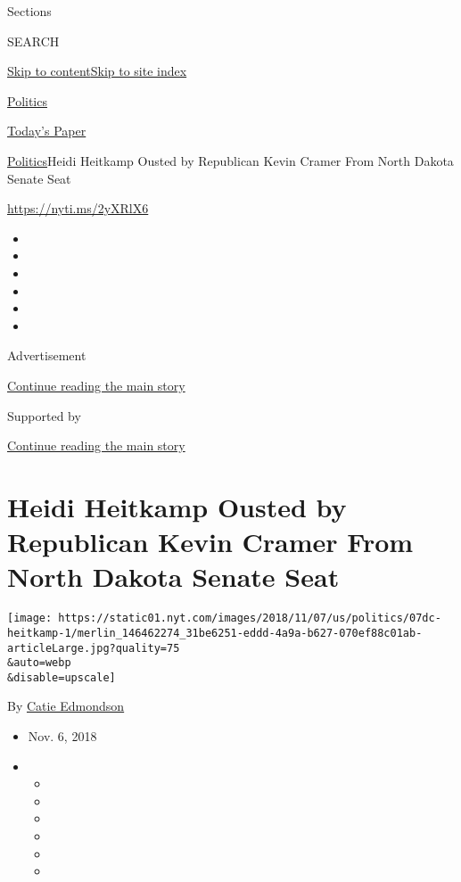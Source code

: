 Sections

SEARCH

\protect\hyperlink{site-content}{Skip to
content}\protect\hyperlink{site-index}{Skip to site index}

\href{https://www.nytimes.com/section/politics}{Politics}

\href{https://myaccount.nytimes.com/auth/login?response_type=cookie\&client_id=vi}{}

\href{https://www.nytimes.com/section/todayspaper}{Today's Paper}

\href{/section/politics}{Politics}\textbar{}Heidi Heitkamp Ousted by
Republican Kevin Cramer From North Dakota Senate Seat

\url{https://nyti.ms/2yXRlX6}

\begin{itemize}
\item
\item
\item
\item
\item
\item
\end{itemize}

Advertisement

\protect\hyperlink{after-top}{Continue reading the main story}

Supported by

\protect\hyperlink{after-sponsor}{Continue reading the main story}

\hypertarget{heidi-heitkamp-ousted-by-republican-kevin-cramer-from-north-dakota-senate-seat}{%
\section{Heidi Heitkamp Ousted by Republican Kevin Cramer From North
Dakota Senate
Seat}\label{heidi-heitkamp-ousted-by-republican-kevin-cramer-from-north-dakota-senate-seat}}

\texttt{[image: https://static01.nyt.com/images/2018/11/07/us/politics/07dc-heitkamp-1/merlin\_146462274\_31be6251-eddd-4a9a-b627-070ef88c01ab-articleLarge.jpg?quality=75\\\&auto=webp\\\&disable=upscale]}

By \href{https://www.nytimes.com/by/catie-edmondson}{Catie Edmondson}

\begin{itemize}
\item
  Nov. 6, 2018
\item
  \begin{itemize}
  \item
  \item
  \item
  \item
  \item
  \item
  \end{itemize}
\end{itemize}

